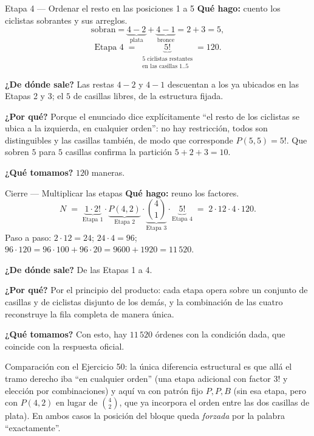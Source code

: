 \documentclass[11pt]{article}
\begin{document}
\begin{paso}{Etapa 4 --- Ordenar el resto en las posiciones 1 a 5}
\textbf{Qu\'e hago:} cuento los ciclistas sobrantes y sus arreglos.
\[
\text{sobran}=\underbrace{4-2}_{\text{plata}}+\underbrace{4-1}_{\text{bronce}}=2+3=5 ,
\]
\[
\text{Etapa 4}\;=\;\underbrace{5!}_{\substack{\text{5 ciclistas restantes}\\ \text{en las casillas }1..5}}=120 .
\]

\textbf{¿De d\'onde sale?} Las restas $4-2$ y $4-1$ descuentan a los ya ubicados en las Etapas 2 y 3; el $5$
de casillas libres, de la estructura fijada.

\textbf{¿Por qu\'e?} Porque el enunciado dice expl\'icitamente ``el resto de los ciclistas se ubica a la
izquierda, en cualquier orden'': no hay restricci\'on, todos son distinguibles y las casillas tambi\'en, de
modo que corresponde $P(5,5)=5!$. Que sobren $5$ para $5$ casillas confirma la partici\'on $5+2+3=10$.

\textbf{¿Qu\'e tomamos?} $120$ maneras.
\end{paso}

\begin{paso}{Cierre --- Multiplicar las etapas}
\textbf{Qu\'e hago:} reuno los factores.
\[
N\;=\;\underbrace{1\cdot 2!}_{\text{Etapa 1}}\cdot\underbrace{P(4,2)}_{\text{Etapa 2}}\cdot\underbrace{\binom{4}{1}}_{\text{Etapa 3}}\cdot\underbrace{5!}_{\text{Etapa 4}}
\;=\;2\cdot 12\cdot 4\cdot 120 .
\]
Paso a paso: $2\cdot 12=24$; $24\cdot 4=96$; $96\cdot 120=96\cdot 100+96\cdot 20=9600+1920=11\,520$.

\textbf{¿De d\'onde sale?} De las Etapas 1 a 4.

\textbf{¿Por qu\'e?} Por el principio del producto: cada etapa opera sobre un conjunto de casillas y de
ciclistas disjunto de los dem\'as, y la combinaci\'on de las cuatro reconstruye la fila completa de manera
\'unica.

\textbf{¿Qu\'e tomamos?} Con esto, hay $11\,520$ \'ordenes con la condici\'on dada, que coincide con la
respuesta oficial.
\end{paso}

\begin{nota}
Comparaci\'on con el Ejercicio 50: la \'unica diferencia estructural es que all\'a el tramo derecho iba ``en
cualquier orden'' (una etapa adicional con factor $3!$ y elecci\'on por combinaciones) y aqu\'i va con
patr\'on fijo $P,P,B$ (sin esa etapa, pero con $P(4,2)$ en lugar de $\binom{4}{2}$, que ya incorpora el orden
entre las dos casillas de plata). En ambos casos la posici\'on del bloque queda \emph{forzada} por la palabra
``exactamente''.
\end{nota}
\end{document}
